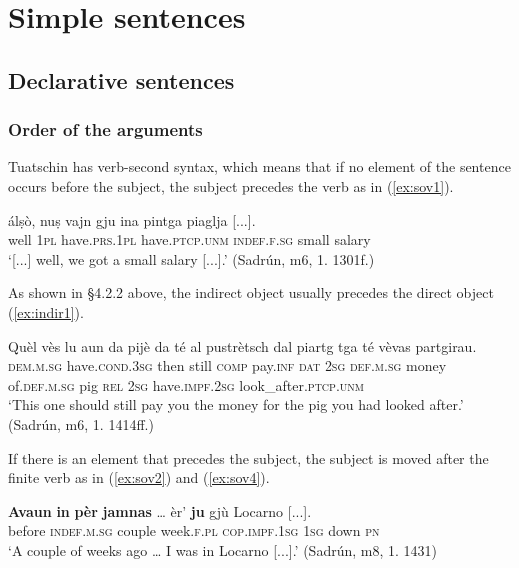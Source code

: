 \chapter{Simple sentences}

\section{Declarative sentences}


\subsection{Order of the arguments}
Tuatschin has verb-second syntax, which means that if no element of the sentence occurs before the subject, the subject precedes the verb as in (\ref{ex:sov1}).

\ea
\label{ex:sov1}
	\gll    [...] álṣò, {\ob}nuṣ{\cb} {\ob}vajn gju{\cb} {\ob}ina pintga piaglja{\cb} [...].\\
 {} well \textsc{1pl} have.\textsc{prs.1pl}  have.\textsc{ptcp.unm} \textsc{indef.f.sg} small salary \\
\glt `[...] well, we got a small salary [...].' (Sadrún, m6, 1. 1301f.)
\z

As shown in §4.2.2 above, the indirect object usually precedes the direct object (\ref{ex:indir1}).

\ea
\label{ex:indir1}
\gll    Quèl vès lu aun da pijè {\ob}da té{\cb} {\ob}al pustrètsch dal piartg tga té vèvas partgirau{\cb}. \\
\textsc{dem.m.sg} have.\textsc{cond.3sg} then still \textsc{comp} pay.\textsc{inf} \textsc{dat} \textsc{2sg} \textsc{def.m.sg} money of.\textsc{def.m.sg} pig \textsc{rel} \textsc{2sg} have.\textsc{impf.2sg} look\_after.\textsc{ptcp.unm}\\
\glt `This one should still pay you the money for the pig you had looked after.' (Sadrún, m6, 1. 1414ff.)
\z

If there is an element that precedes the subject, the subject is moved after the finite verb as in (\ref{ex:sov2}) and (\ref{ex:sov4}).

\ea
\label{ex:sov2}
\gll {\ob}\textbf{Avaun} \textbf{in} \textbf{pèr} \textbf{jamnas}{\cb} … èr’ {\ob}\textbf{ju}{\cb} gjù Locarno [...].\\
before \textsc{indef.m.sg} couple week.\textsc{f.pl} {} \textsc{cop.impf.1sg} \textsc{1sg} down \textsc{pn}\\
\glt `A couple of weeks ago … I was in Locarno [...].' (Sadrún, m8, 1. 1431)
\z

